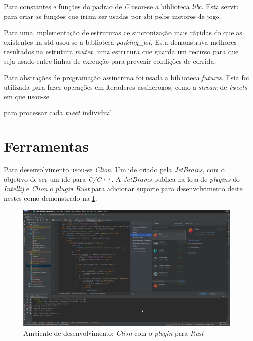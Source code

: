 Para constantes e funções do padrão de \textit{C} usou-se a biblioteca \textit{libc}. Esta serviu para criar as funções que iriam ser usadas por \acrshort{abi} pelos motores de jogo.

Para uma implementação de estruturas de sincronização mais rápidas do que as existentes na \acrshort{std} usou-se a biblioteca \textit{parking\_lot}. Esta demonstrava melhores resultados na estrutura \textit{mutex}, uma estrutura que guarda um recurso para que seja usado entre linhas de execução para prevenir condições de corrida. \cite{parking_lot_benchmarks}

Para abstrações de programação assíncrona foi usada a biblioteca \textit{futures}. Esta foi utilizada para fazer operações em iteradores assíncronos, como a \textit{stream} de \textit{tweets} em que usou-se 

para processar cada \textit{tweet} individual.

\section{Ferramentas}

Para desenvolvimento usou-se \textit{Clion}. Um \acrfull{ide} criado pela \textit{JetBrains}, com o objetivo de ser um \acrshort{ide} para \textit{C/C++}. A \textit{JetBrains} publica na loja de \textit{plugins} do \textit{Intellij} e \textit{Clion} o \textit{plugin} \textit{Rust} para adicionar suporte para desenvolvimento deste nestes  como demonstrado na \cref{fig:devenv}. 

\begin{figure}[H]
    \centering
    \includegraphics[width=\textwidth]{images/devenv-rust.png}
    \caption{Ambiente de desenvolvimento: \textit{Clion} com o \textit{plugin} para \textit{Rust}}
    \label{fig:devenv}
\end{figure}


